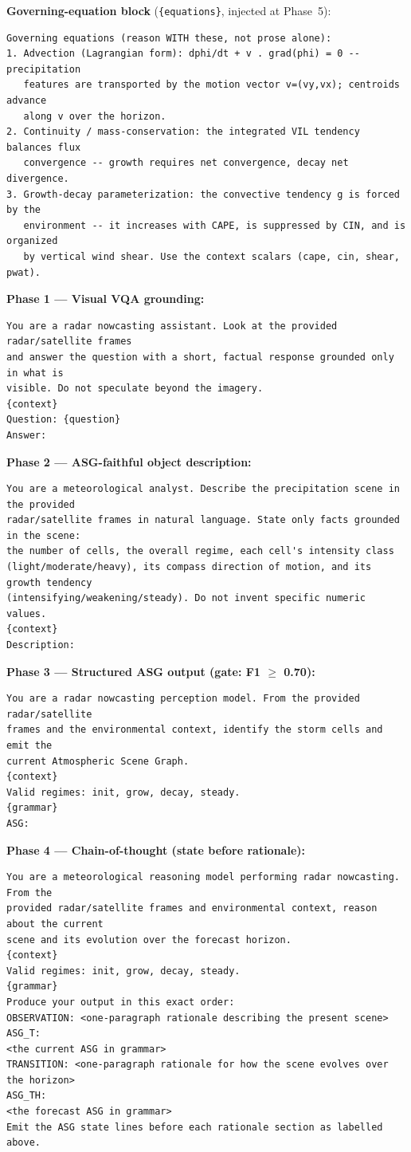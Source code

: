 \documentclass[fleqn,10pt]{wlscirep}
\begin{document}
\noindent\textbf{Governing-equation block} (\texttt{\{equations\}}, injected at Phase~5):
\begin{lstlisting}
Governing equations (reason WITH these, not prose alone):
1. Advection (Lagrangian form): dphi/dt + v . grad(phi) = 0 -- precipitation
   features are transported by the motion vector v=(vy,vx); centroids advance
   along v over the horizon.
2. Continuity / mass-conservation: the integrated VIL tendency balances flux
   convergence -- growth requires net convergence, decay net divergence.
3. Growth-decay parameterization: the convective tendency g is forced by the
   environment -- it increases with CAPE, is suppressed by CIN, and is organized
   by vertical wind shear. Use the context scalars (cape, cin, shear, pwat).
\end{lstlisting}

\noindent\textbf{Phase 1 --- Visual VQA grounding:}
\begin{lstlisting}
You are a radar nowcasting assistant. Look at the provided radar/satellite frames
and answer the question with a short, factual response grounded only in what is
visible. Do not speculate beyond the imagery.
{context}
Question: {question}
Answer:
\end{lstlisting}

\noindent\textbf{Phase 2 --- ASG-faithful object description:}
\begin{lstlisting}
You are a meteorological analyst. Describe the precipitation scene in the provided
radar/satellite frames in natural language. State only facts grounded in the scene:
the number of cells, the overall regime, each cell's intensity class
(light/moderate/heavy), its compass direction of motion, and its growth tendency
(intensifying/weakening/steady). Do not invent specific numeric values.
{context}
Description:
\end{lstlisting}

\noindent\textbf{Phase 3 --- Structured ASG output (gate: F1 $\ge$ 0.70):}
\begin{lstlisting}
You are a radar nowcasting perception model. From the provided radar/satellite
frames and the environmental context, identify the storm cells and emit the
current Atmospheric Scene Graph.
{context}
Valid regimes: init, grow, decay, steady.
{grammar}
ASG:
\end{lstlisting}

\noindent\textbf{Phase 4 --- Chain-of-thought (state before rationale):}
\begin{lstlisting}
You are a meteorological reasoning model performing radar nowcasting. From the
provided radar/satellite frames and environmental context, reason about the current
scene and its evolution over the forecast horizon.
{context}
Valid regimes: init, grow, decay, steady.
{grammar}
Produce your output in this exact order:
OBSERVATION: <one-paragraph rationale describing the present scene>
ASG_T:
<the current ASG in grammar>
TRANSITION: <one-paragraph rationale for how the scene evolves over the horizon>
ASG_TH:
<the forecast ASG in grammar>
Emit the ASG state lines before each rationale section as labelled above.
\end{lstlisting}
\end{document}
